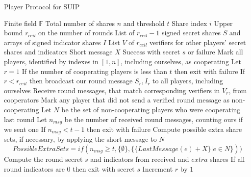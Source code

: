 \documentclass{dalcsthesis}
\begin{document}
\begin{algorithm}
  \caption{Player Protocol for SUIP}
  \label{alg:SUIP:Player}
  \begin{algorithmic}
    \INPUT Finite field $\mathbb{F}$
    \INPUT Total number of shares $n$ and threshold $t$
    \INPUT Share index $i$
    \INPUT Upper bound $r_{ceil}$ on the number of rounds
    \INPUT List of $r_{ceil}-1$ signed secret shares $S$ and arrays of signed indicator shares $I$
    \INPUT List $V$ of $r_{ceil}$ verifiers for other players' secret shares and indicators
    \INPUT Short message $X$
    \OUTPUT Success with secret $s$ or failure
    \STATE Mark all players, identified by indexes in $[1, n]$, including ourselves, as cooperating
    \STATE Let $r = 1$
      \STATE If the number of cooperating players is less than $t$ then exit with failure
      \STATE If $r < r_{ceil}$ then broadcast our round message $S_r, I_r$ to all players, including ourselves
      \STATE Receive round messages, that match corresponding verifiers in $V_r$, from cooperators
      \STATE Mark any player that did not send a verified round message as non-cooperating
      \STATE Let $N$ be the set of non-cooperating players who were cooperating last round
      \STATE Let $n_{msg}$ be the number of received round messages, counting ours if we sent one
      \STATE If $n_{msg} < t - 1$ then exit with failure
      \STATE Compute possible extra share sets, if necessary, by applying the short message to $N$
      		$$PossibleExtraSets = if(n_{msg} \geq t, \{\emptyset\}, \{\{LastMessage(e) + X\} | e \in N\}))$$
        \STATE Compute the round secret $s$ and indicators from received and $extra$ shares
        \STATE If all round indicators are 0 then exit with secret $s$
      \ENDFOR
      \STATE Increment $r$ by $1$
    \ENDWHILE
  \end{algorithmic}
\end{algorithm}
\end{document}
